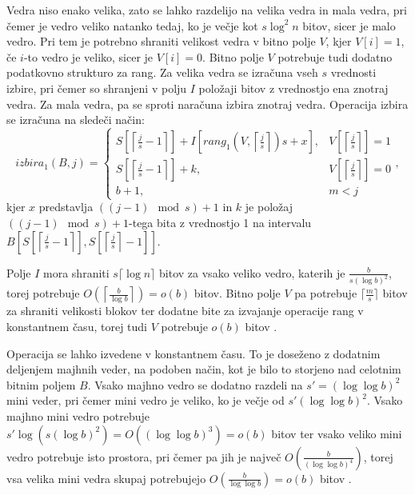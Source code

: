 Vedra niso enako velika, zato se lahko razdelijo na velika vedra in mala vedra, pri čemer je vedro veliko natanko tedaj, ko je večje kot $s\log^2 n$ bitov, sicer je malo vedro. Pri tem je potrebno shraniti velikost vedra v bitno polje $V$, kjer $V[i]=1$, če $i$-to vedro je veliko, sicer je $V[i]=0$. Bitno polje $V$ potrebuje tudi dodatno podatkovno strukturo za rang. Za velika vedra se izračuna vseh $s$ vrednosti izbire, pri čemer so shranjeni v polju $I$ položaji bitov z vrednostjo ena znotraj vedra. Za mala vedra, pa se sproti naračuna izbira znotraj vedra. Operacija izbira se izračuna na sledeči način:
\begin{equation}
    izbira_1(B,j)=\left\{
    \begin{array}{rl}
       S\left[\left\lceil \frac{j}{s} -1\right\rceil\right] + I\left[rang_1(V,\left\lceil \frac{j}{s} \right\rceil)s+x\right], & V\left[\left\lceil \frac{j}{s} \right\rceil\right] = 1\\ 
       S\left[\left\lceil \frac{j}{s} -1 \right\rceil\right] + k, & V\left[\left\lceil \frac{j}{s} \right\rceil\right] = 0\\
       b+1, & m < j
    \end{array}\right.,
\end{equation}
kjer $x$ predstavlja $((j-1) \mod{s})+1$ in $k$ je položaj $((j-1) \mod{s})+1$-tega bita z vrednostjo 1 na intervalu $B\left[ S\left[\left\lceil \frac{j}{s} -1 \right\rceil\right], S\left[\left\lceil \frac{j}{s} \right\rceil-1\right]\right]$.

Polje $I$ mora shraniti $s\lceil\log n\rceil$ bitov za vsako veliko vedro, katerih je $\frac{b}{s(\log b)^2}$, torej potrebuje $O\left(\left\lceil\frac{b}{\log b}\right\rceil\right)=o(b)$ bitov. Bitno polje $V$ pa potrebuje $\lceil \frac{m}{s} \rceil$ bitov za shraniti velikosti blokov ter dodatne bite za izvajanje operacije rang v konstantnem času, torej tudi $V$ potrebuje $o(b)$ bitov \cite{Navarro2016}.

Operacija se lahko izvedene v konstantnem času. To je doseženo z dodatnim deljenjem majhnih veder, na podoben način, kot je bilo to storjeno nad celotnim bitnim poljem $B$. Vsako majhno vedro se dodatno razdeli na $s'=(\log\log b)^2$ mini veder, pri čemer mini vedro je veliko, ko je večje od $s'(\log\log b)^2$. Vsako majhno mini vedro potrebuje $s'\log{(s(\log{b})^2)}=O((\log\log b)^3)=o(b)$ bitov ter vsako veliko mini vedro potrebuje isto prostora, pri čemer pa jih je največ $O\left(\frac{b}{(\log\log b)^4}\right)$, torej vsa velika mini vedra skupaj potrebujejo $O\left(\frac{b}{\log\log b}\right) =o(b)$ bitov \cite{Navarro2016}.


